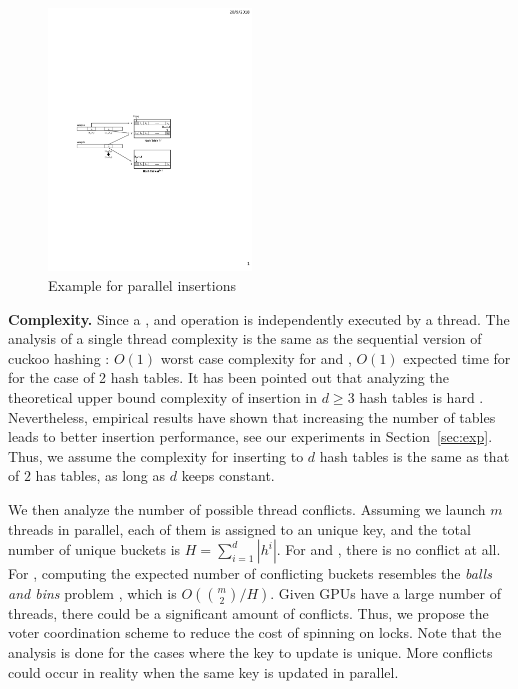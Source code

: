

\begin{figure}[t]
	\centering
	\includegraphics[width=0.48\textwidth]{fig/Voter.pdf}
	\caption{Example for parallel insertions}
	\label{fig:voter}
\end{figure}
\vspace{1mm}\noindent\textbf{Complexity.}
Since a ,  and  operation is independently executed by a thread. 
The analysis of a single thread complexity is the same as the sequential version of cuckoo hashing \cite{pagh2004cuckoo}: $O(1)$ worst case complexity for  and , $O(1)$ expected time for  for the case of 2 hash tables. 
It has been pointed out that analyzing the theoretical upper bound complexity of insertion in $d \geq 3$ hash tables is hard \cite{alcantara2009real}.  
Nevertheless, empirical results have shown that increasing the number of tables leads to better insertion performance, see our experiments in Section~\ref{sec:exp}.
Thus, we assume the complexity for inserting to $d$ hash tables is the same as that of $2$ has tables, as long as $d$ keeps constant.  

We then analyze the number of possible thread conflicts. Assuming we launch $m$ threads in parallel, each of them is assigned to an unique key, and the total number of unique buckets is $H=\sum_{i=1}^d|h^i|$. For  and , there is no conflict at all. 
For , computing the expected number of conflicting buckets resembles the \emph{balls and bins} problem \cite{raab1998balls}, which is $O(\binom{m}{2}/H)$. 
Given GPUs have a large number of threads, there could be a significant amount of conflicts. Thus, we propose the voter coordination scheme to reduce the cost of spinning on locks. Note that the analysis is done for the cases where the key to update is unique. More conflicts could occur in reality when the same key is updated in parallel. 